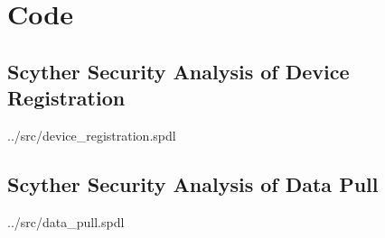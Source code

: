 \chapter{Code}\label{apx:code}


\section{Scyther Security Analysis of Device Registration}\label{apx:scyther-analysis-dr}
\begin{lstinputlisting}
[language=Python]{../src/device_registration.spdl}
\end{lstinputlisting}

\section{Scyther Security Analysis of Data Pull}\label{apx:scyther-analysis-dp}
\begin{lstinputlisting}
[language=Python]{../src/data_pull.spdl}
\end{lstinputlisting}








